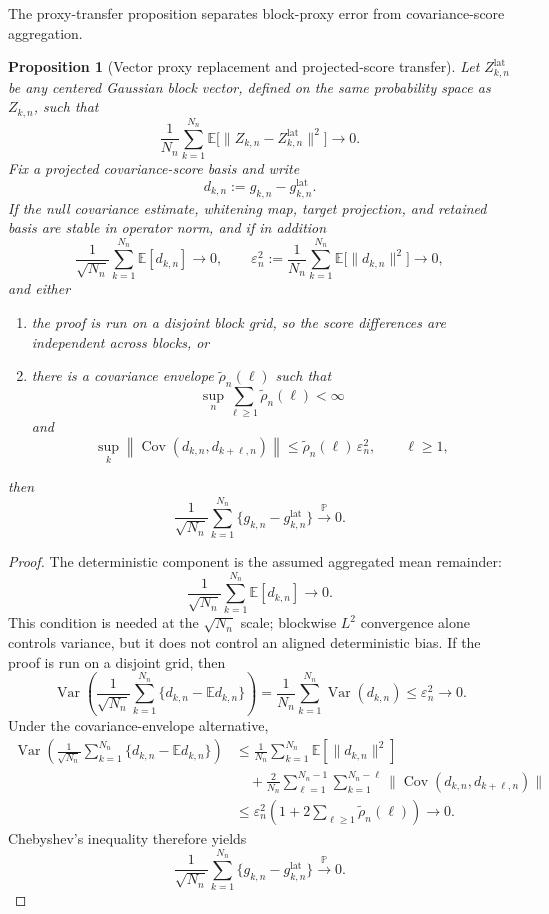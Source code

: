 \documentclass[11pt,a4paper]{amsart}
\theoremstyle{plain}
\newtheorem{proposition}[theorem]{Proposition}
\theoremstyle{definition}
\theoremstyle{remark}
\DeclareMathOperator{\Var}{Var}
\DeclareMathOperator{\Cov}{Cov}
\newcommand{\PP}{\mathbb{P}}
\newcommand{\EE}{\mathbb{E}}
\newcommand{\toP}{\xrightarrow{\PP}}
\begin{document}
The proxy-transfer proposition separates block-proxy error from covariance-score aggregation.

\begin{proposition}[Vector proxy replacement and projected-score transfer]\label{prop:vector-score-transfer}
Let \(Z_{k,n}^{\mathrm{lat}}\) be any centered Gaussian block vector, defined on the same
probability space as \(Z_{k,n}\), such that
\[
        \frac1{N_n}\sum_{k=1}^{N_n}
        \EE\bigl[\|Z_{k,n}-Z_{k,n}^{\mathrm{lat}}\|^2\bigr]\to0.
\]
Fix a projected covariance-score basis and write
\[
        d_{k,n}:=g_{k,n}-g_{k,n}^{\mathrm{lat}}.
\]
If the null covariance estimate, whitening map, target projection, and retained basis are stable in
operator norm, and if in addition
\[
        \frac1{\sqrt{N_n}}\sum_{k=1}^{N_n}\EE[d_{k,n}]\to0,
        \qquad
        \varepsilon_n^2
        :=
        \frac1{N_n}\sum_{k=1}^{N_n}\EE\bigl[\|d_{k,n}\|^2\bigr]\to0,
\]
and either
\begin{enumerate}[label=(\roman*)]
\item the proof is run on a disjoint block grid, so the score differences are independent across
blocks, or
\item there is a covariance envelope \(\widetilde\rho_n(\ell)\) such that
\[
        \sup_n\sum_{\ell\ge1}\widetilde\rho_n(\ell)<\infty
\]
and
\[
        \sup_k
        \left\|
        \Cov(d_{k,n},d_{k+\ell,n})
        \right\|
        \le
        \widetilde\rho_n(\ell)\,\varepsilon_n^2,
        \qquad \ell\ge1,
\]
\end{enumerate}
then
\[
        \frac1{\sqrt{N_n}}\sum_{k=1}^{N_n}
        \{g_{k,n}-g_{k,n}^{\mathrm{lat}}\}
        \toP 0.
\]
\end{proposition}

\begin{proof}
The deterministic component is the assumed aggregated mean remainder:
\[
        \frac1{\sqrt{N_n}}\sum_{k=1}^{N_n}\EE[d_{k,n}]
        \to0.
\]
This condition is needed at the \(\sqrt{N_n}\) scale; blockwise \(L^2\) convergence alone controls
variance, but it does not control an aligned deterministic bias.
If the proof is run on a disjoint grid, then
\[
        \Var\!\left(
        \frac1{\sqrt{N_n}}\sum_{k=1}^{N_n}
        \{d_{k,n}-\EE d_{k,n}\}
        \right)
        =
        \frac1{N_n}\sum_{k=1}^{N_n}\Var(d_{k,n})
        \le
        \varepsilon_n^2
        \to0.
\]
Under the covariance-envelope alternative,
\[
\begin{aligned}
        \Var\!\left(
        \frac1{\sqrt{N_n}}\sum_{k=1}^{N_n}
        \{d_{k,n}-\EE d_{k,n}\}
        \right)
        &\le
        \frac1{N_n}\sum_{k=1}^{N_n}\EE[\|d_{k,n}\|^2] \\
        &\quad+
        \frac{2}{N_n}
        \sum_{\ell=1}^{N_n-1}\sum_{k=1}^{N_n-\ell}
        \|\Cov(d_{k,n},d_{k+\ell,n})\| \\
        &\le
        \varepsilon_n^2
        \left(
        1+2\sum_{\ell\ge1}\widetilde\rho_n(\ell)
        \right)
        \to0 .
\end{aligned}
\]
Chebyshev's inequality therefore yields
\[
        \frac1{\sqrt{N_n}}\sum_{k=1}^{N_n}
        \{g_{k,n}-g_{k,n}^{\mathrm{lat}}\}\toP 0.
\]
\end{proof}
\end{document}
